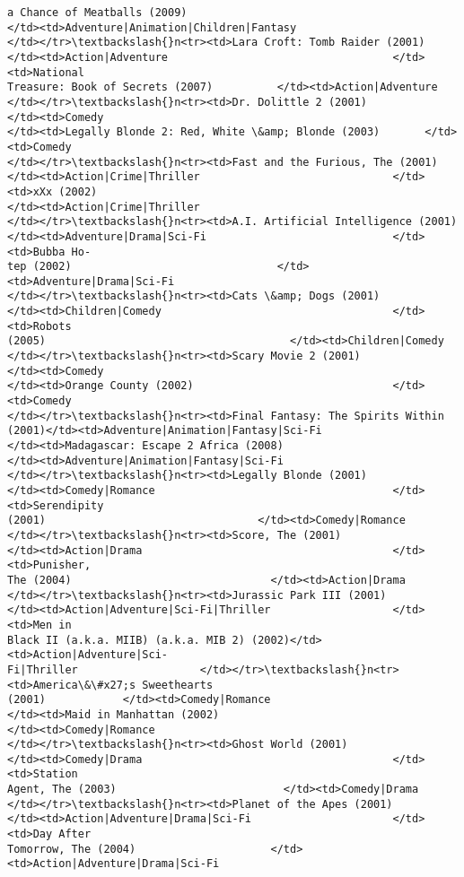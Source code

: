 \documentclass[11pt]{article}
\begin{document}
\begin{tcolorbox}[breakable, size=fbox, boxrule=.5pt, pad at break*=1mm, opacityfill=0]
\begin{Verbatim}[commandchars=\\\{\}]
a Chance of Meatballs (2009)
</td><td>Adventure|Animation|Children|Fantasy
</td></tr>\textbackslash{}n<tr><td>Lara Croft: Tomb Raider (2001)
</td><td>Action|Adventure                                   </td><td>National
Treasure: Book of Secrets (2007)          </td><td>Action|Adventure
</td></tr>\textbackslash{}n<tr><td>Dr. Dolittle 2 (2001)                   </td><td>Comedy
</td><td>Legally Blonde 2: Red, White \&amp; Blonde (2003)       </td><td>Comedy
</td></tr>\textbackslash{}n<tr><td>Fast and the Furious, The (2001)
</td><td>Action|Crime|Thriller                              </td><td>xXx (2002)
</td><td>Action|Crime|Thriller
</td></tr>\textbackslash{}n<tr><td>A.I. Artificial Intelligence (2001)
</td><td>Adventure|Drama|Sci-Fi                             </td><td>Bubba Ho-
tep (2002)                                </td><td>Adventure|Drama|Sci-Fi
</td></tr>\textbackslash{}n<tr><td>Cats \&amp; Dogs (2001)
</td><td>Children|Comedy                                    </td><td>Robots
(2005)                                      </td><td>Children|Comedy
</td></tr>\textbackslash{}n<tr><td>Scary Movie 2 (2001)                    </td><td>Comedy
</td><td>Orange County (2002)                               </td><td>Comedy
</td></tr>\textbackslash{}n<tr><td>Final Fantasy: The Spirits Within
(2001)</td><td>Adventure|Animation|Fantasy|Sci-Fi
</td><td>Madagascar: Escape 2 Africa (2008)
</td><td>Adventure|Animation|Fantasy|Sci-Fi
</td></tr>\textbackslash{}n<tr><td>Legally Blonde (2001)
</td><td>Comedy|Romance                                     </td><td>Serendipity
(2001)                                 </td><td>Comedy|Romance
</td></tr>\textbackslash{}n<tr><td>Score, The (2001)
</td><td>Action|Drama                                       </td><td>Punisher,
The (2004)                               </td><td>Action|Drama
</td></tr>\textbackslash{}n<tr><td>Jurassic Park III (2001)
</td><td>Action|Adventure|Sci-Fi|Thriller                   </td><td>Men in
Black II (a.k.a. MIIB) (a.k.a. MIB 2) (2002)</td><td>Action|Adventure|Sci-
Fi|Thriller                   </td></tr>\textbackslash{}n<tr><td>America\&\#x27;s Sweethearts
(2001)            </td><td>Comedy|Romance
</td><td>Maid in Manhattan (2002)
</td><td>Comedy|Romance
</td></tr>\textbackslash{}n<tr><td>Ghost World (2001)
</td><td>Comedy|Drama                                       </td><td>Station
Agent, The (2003)                          </td><td>Comedy|Drama
</td></tr>\textbackslash{}n<tr><td>Planet of the Apes (2001)
</td><td>Action|Adventure|Drama|Sci-Fi                      </td><td>Day After
Tomorrow, The (2004)                     </td><td>Action|Adventure|Drama|Sci-Fi

\end{Verbatim}
\end{tcolorbox}
\end{document}
